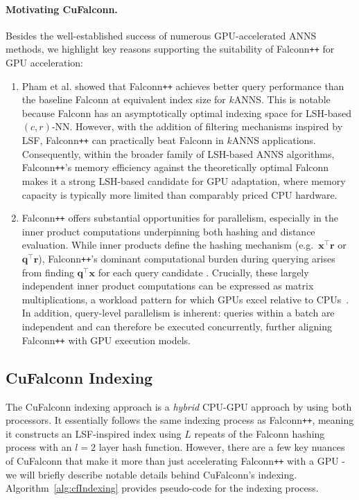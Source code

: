 \documentclass{article}
\newcommand{\bx}{\mathbf{x}}
\newcommand{\br}{\mathbf{r}}
\newcommand{\bq}{\mathbf{q}}
\newcommand{\cf}{CuFalconn\xspace}
\newcommand{\fpp}{Falconn\texttt{++}\xspace}
\newcommand{\crNN}{$(c, r)$-NN\xspace}
\newcommand{\dotqr}{\bq^\top \br}
\newcommand{\dotqx}{\bq^\top \bx}
\newcommand{\dotxr}{\bx^\top \br}
\begin{document}
\paragraph{Motivating \cf.}

Besides the well-established success of numerous GPU-accelerated ANNS methods, we highlight key reasons supporting the suitability of \fpp for GPU acceleration:

\begin{enumerate}
    \item Pham et al. showed that \fpp achieves better query performance than the baseline Falconn at equivalent index size for $k$ANNS. This is notable because Falconn has an asymptotically optimal indexing space for LSH-based \crNN. However, with the addition of filtering mechanisms inspired by LSF, \fpp can practically beat Falconn in $ k$ANNS applications. Consequently, within the broader family of LSH-based ANNS algorithms, \fpp's memory efficiency against the theoretically optimal Falconn makes it a strong LSH-based candidate for GPU adaptation, where memory capacity is typically more limited than comparably priced CPU hardware.

    \item \fpp offers substantial opportunities for parallelism, especially in the inner product computations underpinning both hashing and distance evaluation. While inner products define the hashing mechanism (e.g.\ $\dotxr$ or $\dotqr$), Falconn\texttt{++}'s dominant computational burden during querying arises from finding $\dotqx$ for each query candidate \cite{pham2022falconn++}. Crucially, these largely independent inner product computations can be expressed as matrix multiplications, a workload pattern for which GPUs excel relative to CPUs~\cite{huang2019gpu}. In addition, query-level parallelism is inherent: queries within a batch are independent and can therefore be executed concurrently, further aligning \fpp with GPU execution models.
\end{enumerate}

\subsection{\cf Indexing}

The \cf indexing approach is a \emph{hybrid} CPU-GPU approach by using both processors. It essentially follows the same indexing process as \fpp, meaning it constructs an LSF-inspired index using $L$ repeats of the Falconn hashing process with an $l=2$ layer hash function. However, there are a few key nuances of \cf that make it more than just accelerating \fpp with a GPU - we will briefly describe notable details behind \cf's indexing. Algorithm~\ref{alg:cfIndexing} provides pseudo-code for the indexing process.
\end{document}
